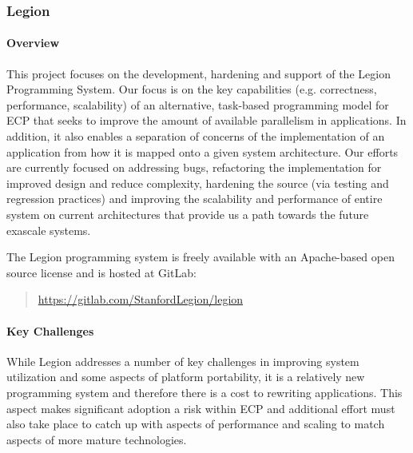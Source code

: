 \subsubsection{ Legion}

\paragraph{Overview}
This project focuses on the development, hardening and support of the
Legion Programming System. Our focus is on the key capabilities (e.g.
correctness, performance, scalability) of an alternative, task-based
programming model for ECP that seeks to improve the amount of
available parallelism in applications.  In addition, it also enables a
separation of concerns of the implementation of an application from
how it is mapped onto a given system architecture.  Our efforts are
currently focused on addressing bugs, refactoring the implementation
for improved design and reduce complexity, hardening the source (via
testing and regression practices) and improving the scalability and
performance of entire system on current architectures that provide us
a path towards the future exascale systems.

The Legion programming system is freely available with an Apache-based
open source license and is hosted at GitLab:

\begin{quote} 
  \url{https://gitlab.com/StanfordLegion/legion}
\end{quote}

\paragraph{Key Challenges}
While Legion addresses a number of key challenges in improving system
utilization and some aspects of platform portability, it is a
relatively new programming system and therefore there is a cost to
rewriting applications.  This aspect makes significant adoption a risk
within ECP and additional effort must also take place to catch up with
aspects of performance and scaling to match aspects of more mature
technologies.

